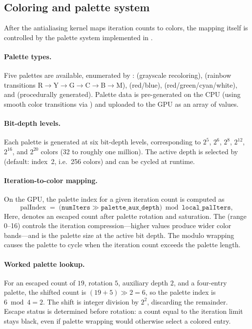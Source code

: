 \subsection{Coloring and palette system}
\label{subsec:coloring}

After the antialiasing kernel maps iteration counts to colors, the
mapping itself is controlled by the palette system implemented in
.

\paragraph{Palette types.}
Five palettes are available, enumerated by
:
 (grayscale recoloring),
 (rainbow transitions R$\to$Y$\to$G$\to$C$\to$B$\to$M),
 (red/blue),
 (red/green/cyan/white), and
 (procedurally generated).
Palette data is pre-generated on the CPU (using smooth color
transitions via ) and uploaded to the GPU as an
array of  values.

\paragraph{Bit-depth levels.}
Each palette is generated at six bit-depth levels, corresponding to
$2^5$, $2^6$, $2^8$, $2^{12}$, $2^{16}$, and $2^{20}$ colors
(32 to roughly one million).  The active depth is selected by
 (default: index~2, i.e.\ 256 colors)
and can be cycled at runtime.

\paragraph{Iteration-to-color mapping.}
On the GPU, the palette index for a given iteration count is computed
as
\[
  \mathrm{palIndex} \;=\;
  \bigl(\mathtt{numIters} \gg \mathtt{palette\_aux\_depth}\bigr)
    \bmod \mathtt{local\_palIters},
\]
Here,  denotes an escaped count after palette rotation and
saturation. The  (range 0--16) controls the iteration
compression---higher values produce wider color bands---and
 is the palette size at the active bit depth.
The modulo wrapping causes the palette to cycle when the iteration
count exceeds the palette length.

\paragraph{Worked palette lookup.}
For an escaped count of $19$, rotation $5$, auxiliary depth $2$, and a four-entry
palette, the shifted count is $(19+5)\gg2=6$, so the palette index is $6\bmod4=2$.
The shift is integer division by $2^2$, discarding the remainder. Escape status
is determined before rotation: a count equal to the iteration limit stays black,
even if palette wrapping would otherwise select a colored entry.

